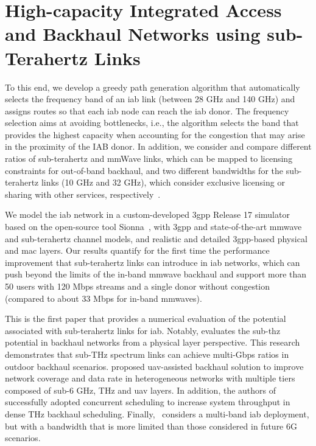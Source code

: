 


\section{High-capacity Integrated Access and Backhaul Networks using sub-Terahertz Links}
\label{sec:intro}

To this end, 
%
we develop a greedy path generation algorithm that automatically selects the frequency band of an \gls{iab} link (between 28 GHz and 140 GHz) and assigns routes so that each \gls{iab} node can reach the \gls{iab} donor. The frequency selection aims at avoiding bottlenecks, i.e., the algorithm selects the band that provides the highest capacity when accounting for the congestion that may arise in the proximity of the IAB donor. In addition, we consider and compare different ratios of sub-terahertz and mmWave links, which can be mapped to licensing constraints for out-of-band backhaul, and two different bandwidths for the sub-terahertz links (10 GHz and 32 GHz), which consider exclusive licensing or sharing with other services, respectively~\cite{polese2022dynamic}.

We model the \gls{iab} network in a custom-developed \gls{3gpp} Release 17 simulator based on the open-source tool Sionna~\cite{hoydis2022sionna}, with \gls{3gpp} and state-of-the-art \gls{mmwave} and sub-terahertz channel models, and realistic and detailed \gls{3gpp}-based physical and \gls{mac} layers. Our results quantify for the first time the performance improvement that sub-terahertz links can introduce in \gls{iab} networks, which can push beyond the limits of the in-band \gls{mmwave} backhaul and support more than 50 users with 120 Mbps streams and a single donor without congestion (compared to about 33 Mbps for in-band \glspl{mmwave}). 

This is the first paper that provides a numerical evaluation of the potential associated with sub-terahertz links for \gls{iab}. Notably, \cite{9135258} evaluates the sub-\gls{thz} potential in backhaul networks from a physical layer perspective. This research demonstrates that sub-THz spectrum links can achieve multi-Gbps ratios in outdoor backhaul scenarios. \cite{9163026} proposed \gls{uav}-assisted backhaul solution to improve network coverage and data rate in heterogeneous networks with multiple tiers composed of sub-6 GHz, THz and \gls{uav} layers. In addition, the authors of \cite{9136652} successfully adopted concurrent scheduling to increase system throughput in dense THz backhaul scheduling. Finally,~\cite{saha2018integrated} considers a multi-band \gls{iab} deployment, but with a bandwidth that is more limited than those considered in future 6G scenarios. 

